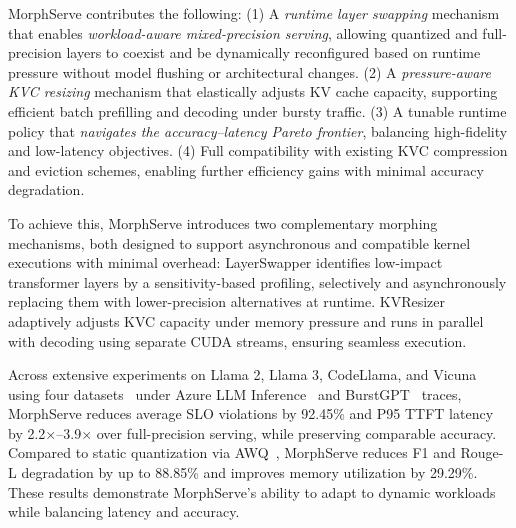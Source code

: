 \documentclass{article}
\newcommand{\system}{{MorphServe}\xspace}
\newcommand{\quant}{\small\textsf{LayerSwapper}\xspace}
\newcommand{\kvc}{\small\textsf{KVResizer}\xspace}
\begin{document}
{\system} contributes the following:
(1) A \textit{runtime layer swapping} mechanism that enables \textit{workload-aware mixed-precision serving}, allowing quantized and full-precision layers to coexist and be dynamically reconfigured based on runtime pressure without model flushing or architectural changes.
(2) A \textit{pressure-aware KVC resizing} mechanism that elastically adjusts KV cache capacity, supporting efficient batch prefilling and decoding under bursty traffic.
(3) A tunable runtime policy that \textit{navigates the accuracy–latency Pareto frontier}, balancing high-fidelity and low-latency objectives.
(4) Full compatibility with existing KVC compression and eviction schemes, enabling further efficiency gains with minimal accuracy degradation.

To achieve this, {\system} introduces two complementary morphing mechanisms, both designed to support asynchronous and compatible kernel executions with minimal overhead:
{\quant} identifies low-impact transformer layers by a sensitivity-based profiling, selectively and asynchronously replacing them with lower-precision alternatives at runtime. 
{\kvc} adaptively adjusts KVC capacity under memory pressure and runs in parallel with decoding using separate CUDA streams, ensuring seamless execution. 


Across extensive experiments on Llama 2, Llama 3, CodeLlama, and Vicuna using four datasets~\cite{gov_report, zhong2021qmsum, he2017dureader, fabbri2019multi} under Azure LLM Inference~\cite{azure_LLM_inference_trace} and BurstGPT~\cite{wang2024burstgpt} traces, {\system} reduces average SLO violations by 92.45\% and P95 TTFT latency by 2.2$\times$–3.9$\times$ over full-precision serving, while preserving comparable accuracy. Compared to static quantization via AWQ~\cite{lin2024awq}, {\system} reduces F1 and Rouge-L degradation by up to 88.85\% and improves memory utilization by 29.29\%. These results demonstrate {\system}'s ability to adapt to dynamic workloads while balancing latency and accuracy.
\end{document}
